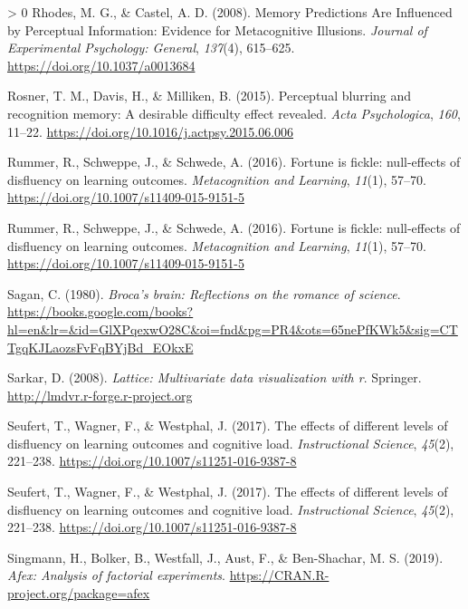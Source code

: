 \documentclass[
  english,
  jou]{apa7}
\newlength{\cslhangindent}
\newenvironment{CSLReferences}[3] %
 {%
  \setlength{\parindent}{0pt}
  \ifodd #1 \everypar{\setlength{\hangindent}{\cslhangindent}}\ignorespaces\fi
  \ifnum #2 > 0
  \setlength{\parskip}{#2\baselineskip}
  \fi
 }%
 {}
\begin{document}
\begin{CSLReferences}{1}{0}
\leavevmode\hypertarget{ref-Rhodes2008}{}%
Rhodes, M. G., \& Castel, A. D. (2008). {Memory Predictions Are Influenced by Perceptual Information: Evidence for Metacognitive Illusions}. \emph{Journal of Experimental Psychology: General}, \emph{137}(4), 615--625. \url{https://doi.org/10.1037/a0013684}

\leavevmode\hypertarget{ref-Rosner2015}{}%
Rosner, T. M., Davis, H., \& Milliken, B. (2015). {Perceptual blurring and recognition memory: A desirable difficulty effect revealed}. \emph{Acta Psychologica}, \emph{160}, 11--22. \url{https://doi.org/10.1016/j.actpsy.2015.06.006}

\leavevmode\hypertarget{ref-Rummer2016}{}%
Rummer, R., Schweppe, J., \& Schwede, A. (2016). {Fortune is fickle: null-effects of disfluency on learning outcomes}. \emph{Metacognition and Learning}, \emph{11}(1), 57--70. \url{https://doi.org/10.1007/s11409-015-9151-5}

\leavevmode\hypertarget{ref-Rummer2016}{}%
Rummer, R., Schweppe, J., \& Schwede, A. (2016). {Fortune is fickle: null-effects of disfluency on learning outcomes}. \emph{Metacognition and Learning}, \emph{11}(1), 57--70. \url{https://doi.org/10.1007/s11409-015-9151-5}

\leavevmode\hypertarget{ref-Sagan1980}{}%
Sagan, C. (1980). \emph{{Broca's brain: Reflections on the romance of science}}. \url{https://books.google.com/books?hl=en\&lr=\&id=GlXPqexwO28C\&oi=fnd\&pg=PR4\&ots=65nePfKWk5\&sig=CTTgqKJLaozsFvFqBYjBd_EOkxE}

\leavevmode\hypertarget{ref-R-lattice}{}%
Sarkar, D. (2008). \emph{Lattice: Multivariate data visualization with r}. Springer. \url{http://lmdvr.r-forge.r-project.org}

\leavevmode\hypertarget{ref-Seufert2017}{}%
Seufert, T., Wagner, F., \& Westphal, J. (2017). {The effects of different levels of disfluency on learning outcomes and cognitive load}. \emph{Instructional Science}, \emph{45}(2), 221--238. \url{https://doi.org/10.1007/s11251-016-9387-8}

\leavevmode\hypertarget{ref-Seufert2017}{}%
Seufert, T., Wagner, F., \& Westphal, J. (2017). {The effects of different levels of disfluency on learning outcomes and cognitive load}. \emph{Instructional Science}, \emph{45}(2), 221--238. \url{https://doi.org/10.1007/s11251-016-9387-8}

\leavevmode\hypertarget{ref-R-afex}{}%
Singmann, H., Bolker, B., Westfall, J., Aust, F., \& Ben-Shachar, M. S. (2019). \emph{Afex: Analysis of factorial experiments}. \url{https://CRAN.R-project.org/package=afex}


\end{CSLReferences}
\end{document}
